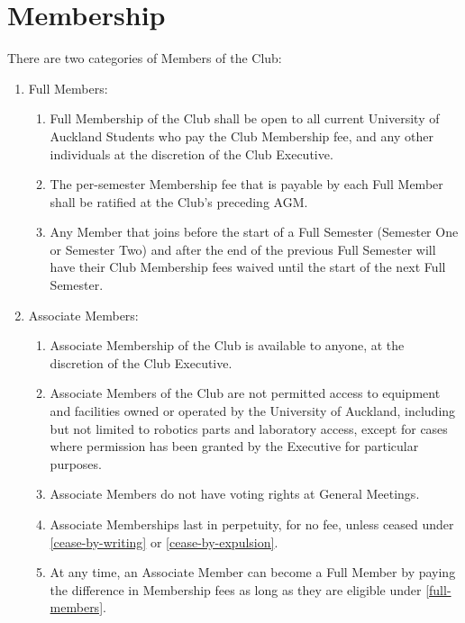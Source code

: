 \documentclass[a4paper]{article}
\begin{document}
	\section{Membership}
	There are two categories of Members of the Club:
	\begin{enumerate}
		\item \label{full-members} Full Members:
		\begin{enumerate}
			\item Full Membership of the Club shall be open to all current University of Auckland Students who pay the Club Membership fee, and any other individuals at the discretion of the Club Executive.
			
			\item The per-semester Membership fee that is payable by each Full Member shall be ratified at the Club's preceding \ac{AGM}.
			
			\item Any Member that joins before the start of a Full Semester (Semester One or Semester Two) and after the end of the previous Full Semester will have their Club Membership fees waived until the start of the next Full Semester.
		\end{enumerate}
	
		\item Associate Members:
		\begin{enumerate}
			\item Associate Membership of the Club is available to anyone, at the discretion of the Club Executive.
			
			\item Associate Members of the Club are not permitted access to equipment and facilities owned or operated by the University of Auckland, including but not limited to robotics parts and laboratory access, except for cases where permission has been granted by the Executive for particular purposes.
			
			\item Associate Members do not have voting rights at General Meetings.
			
			\item Associate Memberships last in perpetuity, for no fee, unless ceased under \ref{cease-by-writing} or \ref{cease-by-expulsion}.
			
			\item At any time, an Associate Member can become a Full Member by paying the difference in Membership fees as long as they are eligible under \ref{full-members}.
		\end{enumerate}
	\end{enumerate}
	
\end{document}

